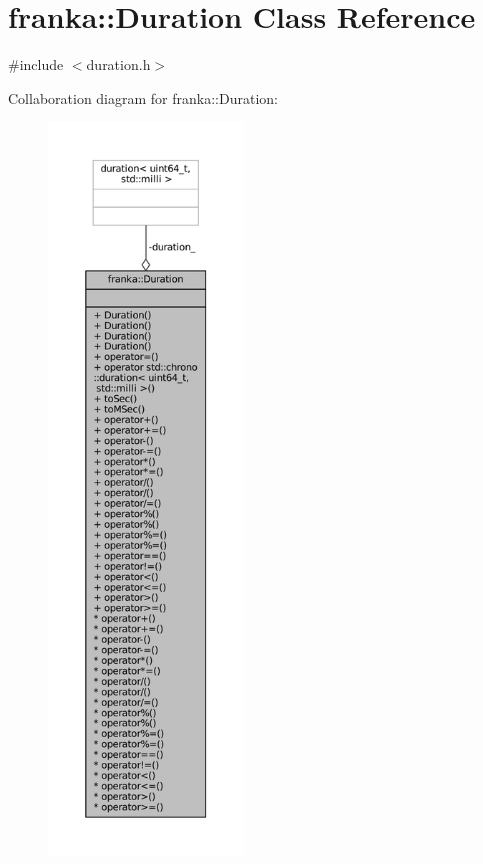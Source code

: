 \hypertarget{classfranka_1_1Duration}{}\section{franka\+:\+:Duration Class Reference}
\label{classfranka_1_1Duration}


{\ttfamily \#include $<$duration.\+h$>$}



Collaboration diagram for franka\+:\+:Duration\+:
\nopagebreak
\begin{figure}[H]
\begin{center}
\leavevmode
\includegraphics[height=550pt]{classfranka_1_1Duration__coll__graph}
\end{center}
\end{figure}
